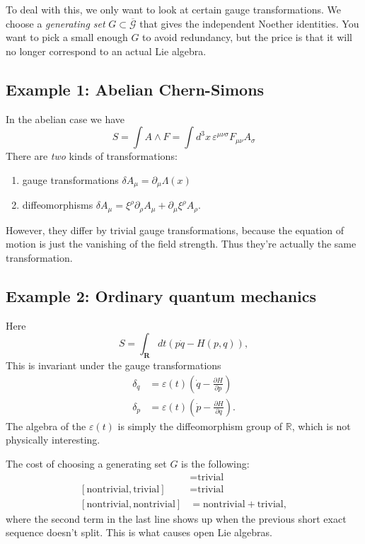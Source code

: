 To deal with this, we only want to look at certain gauge transformations.
We choose a \emph{generating set} $G \subset \overline{\mathcal{G}}$ that gives the independent Noether identities.
You want to pick a small enough $G$ to avoid redundancy, but the price is that it will no longer correspond to an actual Lie algebra.

\subsection*{Example 1: Abelian Chern-Simons}
In the abelian case we have
\[
S = \int A \wedge F = \int d^3x\, \varepsilon^{\mu \nu \sigma}F_{\mu \nu} A_{\sigma}
\]
There are \emph{two} kinds of transformations:
\begin{enumerate}
    \item gauge transformations $\delta A_\mu = \partial_\mu \Lambda(x)$
    \item diffeomorphisms $\delta A_\mu = \xi^\rho \partial_\rho A_\mu + \partial_\mu \xi^\rho A_\rho$.
\end{enumerate}
However, they differ by trivial gauge transformations, because the equation of motion is just the vanishing of the field strength.
Thus they're actually the same transformation.

\subsection*{Example 2: Ordinary quantum mechanics}
Here
\[
S = \int_{\mathbf R} dt(p \dot q - H(p,q)),
\]
This is invariant under the gauge transformations
\begin{align*}
\delta_q &= \varepsilon(t) \left(\dot q - \frac{\partial H}{\partial p} \right)\\
\delta_p &= \varepsilon(t) \left(\dot p - \frac{\partial H}{\partial q} \right).
\end{align*}
The algebra of the $\varepsilon(t)$ is simply the diffeomorphism group of $\mathbb R$, which is not physically interesting.

The cost of choosing a generating set $G$ is the following:
\begin{align*}
[\text{trivial},\text{trivial}] &= \text{trivial}\\
[\text{nontrivial}, \text{trivial}] &= \text{trivial}\\
[\text{nontrivial}, \text{nontrivial}] &= \text{nontrivial}+ \text{trivial}, 
\end{align*}
where the second term in the last line shows up when the previous short exact sequence doesn't split.
This is what causes open Lie algebras.
